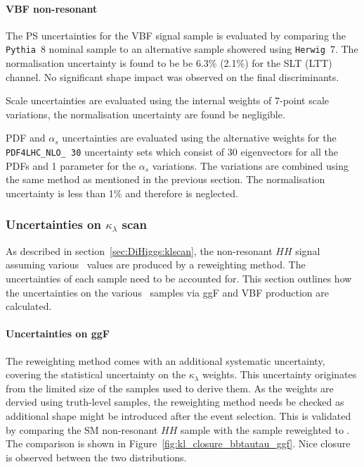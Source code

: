 \paragraph{VBF non-resonant}
The PS uncertainties for the
VBF signal sample is evaluated by comparing the
\texttt{Pythia}~8 nominal sample to an alternative sample 
showered using \texttt{Herwig}~7.
The normalisation uncertainty is found to be be 6.3\% (2.1\%)
for the SLT (LTT) channel.
No significant shape impact was observed on the final discriminants.

Scale uncertainties are evaluated using the internal weights 
of 7-point scale variations, the normalisation uncertainty are found be negligible.

PDF and $\alpha_s$ uncertainties are evaluated
using the alternative weights for the \texttt{PDF4LHC\_NLO\_ 30}
uncertainty sets which consist of 30 eigenvectors for
all the PDFs and 1 parameter for the $\alpha_s$ variations.
The variations are combined using the same method as mentioned in 
the previous section. 
The normalisation uncertainty is less than 1\% and therefore is neglected.








\subsubsection{Uncertainties on $\kappa_\lambda$ scan}
\label{subsubsec:klscan}
As described in section~\ref{sec:DiHiggs:klscan}, the non-resonant $HH$ signal 
assuming various \kl\ values are produced by a reweighting method. 
The uncertainties of each sample need to be accounted for.
This section outlines how the uncertainties on the various \kl\ samples
via ggF and VBF production are calculated.
\paragraph{Uncertainties on ggF}
The reweighting method comes with an additional systematic uncertainty, 
covering the statistical uncertainty on the $\kappa_\lambda$ weights.
This uncertainty originates from the limited size of the samples used to derive them.
As the weights are dervied using truth-level samples, the reweighting method needs be checked
as additional shape might be introduced after the event selection.  
This is validated by comparing the SM non-resonant $HH$ sample
with the  sample reweighted to . 
The comparison is shown in Figure~\ref{fig:kl_closure_bbtautau_ggf}.
Nice closure is observed between the two distributions. 

